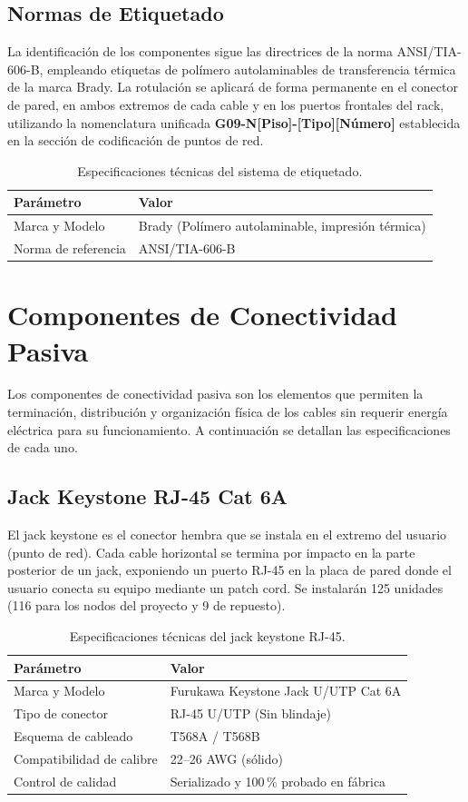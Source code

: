 \subsection{Normas de Etiquetado}
La identificación de los componentes sigue las directrices de la norma ANSI/TIA-606-B, empleando etiquetas de polímero autolaminables de transferencia térmica de la marca Brady.
La rotulación se aplicará de forma permanente en el conector de pared, en ambos extremos de cada cable y en los puertos frontales del rack, utilizando la nomenclatura unificada \textbf{G09-N[Piso]-[Tipo][Número]} establecida en la sección de codificación de puntos de red.

\begin{table}[H]
\centering
\caption{Especificaciones técnicas del sistema de etiquetado.}
\label{tab:spec_etiquetado}
\begin{tabular}{lp{9cm}}
\hline
\textbf{Parámetro} & \textbf{Valor} \\
\hline
Marca y Modelo & Brady (Polímero autolaminable, impresión térmica) \\
Norma de referencia & ANSI/TIA-606-B \\
\hline
\end{tabular}
\end{table}

\section{Componentes de Conectividad Pasiva}
Los componentes de conectividad pasiva son los elementos que permiten la terminación, distribución y organización física de los cables sin requerir energía eléctrica para su funcionamiento. A continuación se detallan las especificaciones de cada uno.

\subsection{Jack Keystone RJ-45 Cat 6A}
El jack keystone es el conector hembra que se instala en el extremo del usuario (punto de red). Cada cable horizontal se termina por impacto en la parte posterior de un jack, exponiendo un puerto RJ-45 en la placa de pared donde el usuario conecta su equipo mediante un patch cord. Se instalarán 125 unidades (116 para los nodos del proyecto y 9 de repuesto).

\begin{table}[H]
\centering
\caption{Especificaciones técnicas del jack keystone RJ-45.}
\label{tab:spec_jack}
\begin{tabular}{lp{9cm}}
\hline
\textbf{Parámetro} & \textbf{Valor} \\
\hline
Marca y Modelo & Furukawa Keystone Jack U/UTP Cat 6A \\
Tipo de conector & RJ-45 U/UTP (Sin blindaje) \\
Esquema de cableado & T568A / T568B \\
Compatibilidad de calibre & 22--26 AWG (sólido) \\
Control de calidad & Serializado y 100\,\% probado en fábrica \\
\hline
\end{tabular}
\end{table}

